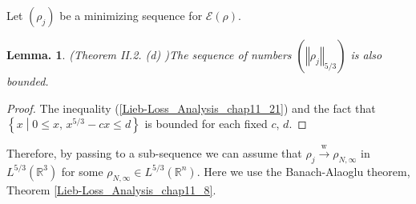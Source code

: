 \documentclass[openany, a4paper, oneside]{jsbook}
\theoremstyle{break}
\newtheorem{lem}[thm]{Lemma.}
\theoremstyle{breakdefn}
\newcommand{\norm}[1]{\left\Vert#1\right\Vert}
\newcommand{\relmiddle}[1]{\mathrel{}\middle#1\mathrel{}}
\newcommand{\set}[2]{\left\{#1 \relmiddle| #2\right\}}
\newcommand{\bbRthree}{\mathbb{R}^3}
\newcommand{\bbRn}{\mathbb{R}^n}
\newcommand{\calE}{\mathcal{E}}
\newcommand{\rhoNinfty}{\rho_{N, \infty}}
\newcommand{\wto}{\xrightarrow{\text{w}}}
\begin{document}
Let $(\rho_j)$ be a minimizing sequence for $\calE (\rho)$.
\begin{lem}\textup{(Theorem II.2. (d) \cite{LiebSimon1})}\label{Lieb-Loss_Analysis_chap11_20}
 The sequence of numbers $(\norm{\rho_j}_{5/3})$ is also bounded.
\end{lem}
\begin{proof}
The inequality (\ref{Lieb-Loss_Analysis_chap11_21}) and the fact that $\set{x}{0 \leq x, \, x^{5/3} - cx \leq d}$ is bounded for each fixed $c$, $d$.
\end{proof}

Therefore, by passing to a sub-sequence we can assume that $\rho_j \wto \rhoNinfty$ in $L^{5/3} (\bbRthree)$ for some $\rhoNinfty \in L^{5/3} (\bbRn)$.
Here we use the Banach-Alaoglu theorem, Theorem \ref{Lieb-Loss_Analysis_chap11_8}.
\end{document}

